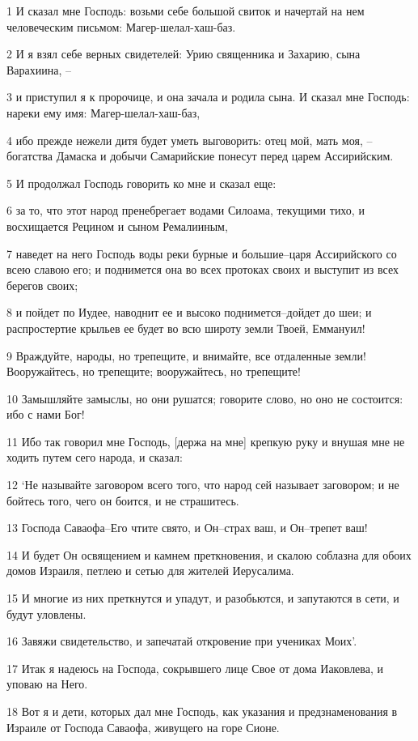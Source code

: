 \par 1 И сказал мне Господь: возьми себе большой свиток и начертай на нем человеческим письмом: Магер-шелал-хаш-баз.
\par 2 И я взял себе верных свидетелей: Урию священника и Захарию, сына Варахиина, --
\par 3 и приступил я к пророчице, и она зачала и родила сына. И сказал мне Господь: нареки ему имя: Магер-шелал-хаш-баз,
\par 4 ибо прежде нежели дитя будет уметь выговорить: отец мой, мать моя, --богатства Дамаска и добычи Самарийские понесут перед царем Ассирийским.
\par 5 И продолжал Господь говорить ко мне и сказал еще:
\par 6 за то, что этот народ пренебрегает водами Силоама, текущими тихо, и восхищается Рецином и сыном Ремалииным,
\par 7 наведет на него Господь воды реки бурные и большие--царя Ассирийского со всею славою его; и поднимется она во всех протоках своих и выступит из всех берегов своих;
\par 8 и пойдет по Иудее, наводнит ее и высоко поднимется--дойдет до шеи; и распростертие крыльев ее будет во всю широту земли Твоей, Еммануил!
\par 9 Враждуйте, народы, но трепещите, и внимайте, все отдаленные земли! Вооружайтесь, но трепещите; вооружайтесь, но трепещите!
\par 10 Замышляйте замыслы, но они рушатся; говорите слово, но оно не состоится: ибо с нами Бог!
\par 11 Ибо так говорил мне Господь, [держа на мне] крепкую руку и внушая мне не ходить путем сего народа, и сказал:
\par 12 `Не называйте заговором всего того, что народ сей называет заговором; и не бойтесь того, чего он боится, и не страшитесь.
\par 13 Господа Саваофа--Его чтите свято, и Он--страх ваш, и Он--трепет ваш!
\par 14 И будет Он освящением и камнем преткновения, и скалою соблазна для обоих домов Израиля, петлею и сетью для жителей Иерусалима.
\par 15 И многие из них преткнутся и упадут, и разобьются, и запутаются в сети, и будут уловлены.
\par 16 Завяжи свидетельство, и запечатай откровение при учениках Моих'.
\par 17 Итак я надеюсь на Господа, сокрывшего лице Свое от дома Иаковлева, и уповаю на Него.
\par 18 Вот я и дети, которых дал мне Господь, как указания и предзнаменования в Израиле от Господа Саваофа, живущего на горе Сионе.
